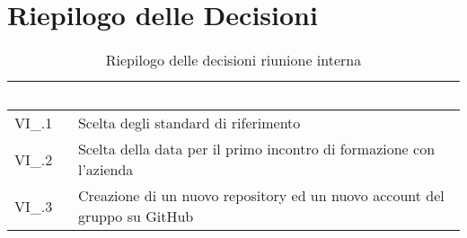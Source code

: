 \section{Riepilogo delle Decisioni}


\begin{table}[!htbp]
\renewcommand{\arraystretch}{1.5}
\begin{tabular}{m{}<{\centering}  m{}<{\centering}}
\rowcolor{darkblue} \textcolor{white}{\textbf{Codice}} & \textcolor{white}{\textbf{Decisione}} \\
\hline
VI\_\D{}.1 & Scelta degli standard di riferimento \\
\rowcolor{gray!10} VI\_\D{}.2 & Scelta della data per il primo incontro di formazione con l'azienda \\
VI\_\D{}.3 & Creazione di un nuovo repository ed un nuovo account del gruppo su GitHub \\
\end{tabular}
\caption{Riepilogo delle decisioni riunione interna \D{}}
\end{table}